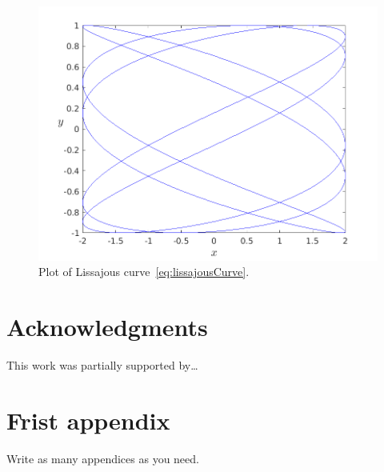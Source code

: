 \documentclass[10pt,twoside]{article}
\theoremstyle{remark}
\theoremstyle{definition}
\begin{document}
\begin{figure}[!h]
\centering
\includegraphics[scale=0.75]{lissajousCurve}
\caption{Plot of Lissajous curve~\eqref{eq:lissajousCurve}.} 
\label{fig:lissajousCurve}
\end{figure}

\section*{Acknowledgments}
\noindent This work was partially supported by\ldots



\nocite{*}

\appendix
\section{Frist appendix}
\noindent Write as many appendices as you need.
\end{document}

